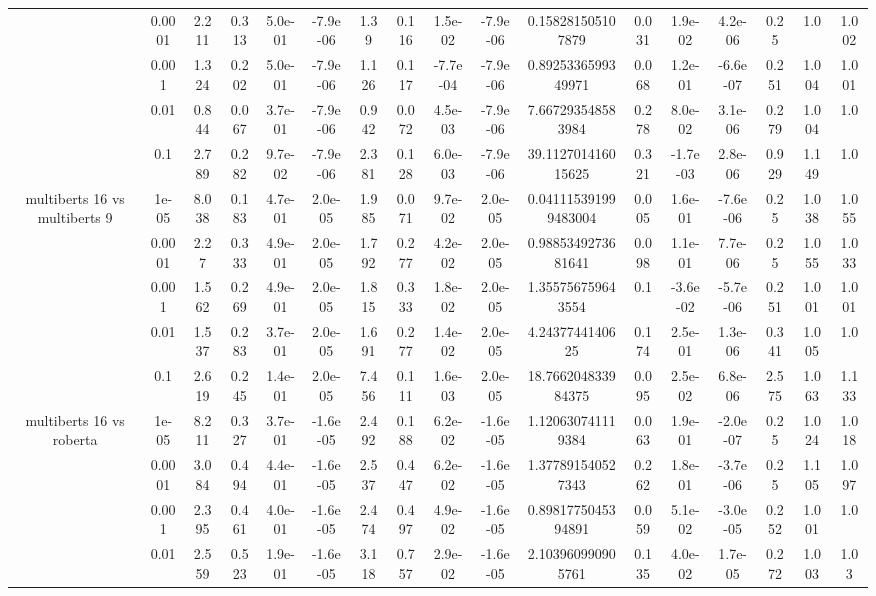 \begin{tabular}{|c|c|c|c|c|c|c|c|c|c|c|c|c|c|c|c|c|}
 & 0.0001 & 2.211 & 0.313 & 5.0e-01 & -7.9e-06 & 1.39 & 0.116 & 1.5e-02 & -7.9e-06 & 0.158281505107879 & 0.031 & 1.9e-02 & 4.2e-06 & 0.25 & 1.0 & 1.002 \\
 & 0.001 & 1.324 & 0.202 & 5.0e-01 & -7.9e-06 & 1.126 & 0.117 & -7.7e-04 & -7.9e-06 & 0.8925336599349971 & 0.068 & 1.2e-01 & -6.6e-07 & 0.251 & 1.004 & 1.001 \\
 & 0.01 & 0.844 & 0.067 & 3.7e-01 & -7.9e-06 & 0.942 & 0.072 & 4.5e-03 & -7.9e-06 & 7.667293548583984 & 0.278 & 8.0e-02 & 3.1e-06 & 0.279 & 1.004 & 1.0 \\
 & 0.1 & 2.789 & 0.282 & 9.7e-02 & -7.9e-06 & 2.381 & 0.128 & 6.0e-03 & -7.9e-06 & 39.112701416015625 & 0.321 & -1.7e-03 & 2.8e-06 & 0.929 & 1.149 & 1.0 \\
\hline
\multirow{5}{*}{multiberts 16 vs multiberts 9} & 1e-05 & 8.038 & 0.183 & 4.7e-01 & 2.0e-05 & 1.985 & 0.071 & 9.7e-02 & 2.0e-05 & 0.041115391999483004 & 0.005 & 1.6e-01 & -7.6e-06 & 0.25 & 1.038 & 1.055 \\
 & 0.0001 & 2.27 & 0.333 & 4.9e-01 & 2.0e-05 & 1.792 & 0.277 & 4.2e-02 & 2.0e-05 & 0.9885349273681641 & 0.098 & 1.1e-01 & 7.7e-06 & 0.25 & 1.055 & 1.033 \\
 & 0.001 & 1.562 & 0.269 & 4.9e-01 & 2.0e-05 & 1.815 & 0.333 & 1.8e-02 & 2.0e-05 & 1.355756759643554 & 0.1 & -3.6e-02 & -5.7e-06 & 0.251 & 1.001 & 1.001 \\
 & 0.01 & 1.537 & 0.283 & 3.7e-01 & 2.0e-05 & 1.691 & 0.277 & 1.4e-02 & 2.0e-05 & 4.2437744140625 & 0.174 & 2.5e-01 & 1.3e-06 & 0.341 & 1.005 & 1.0 \\
 & 0.1 & 2.619 & 0.245 & 1.4e-01 & 2.0e-05 & 7.456 & 0.111 & 1.6e-03 & 2.0e-05 & 18.766204833984375 & 0.095 & 2.5e-02 & 6.8e-06 & 2.575 & 1.063 & 1.133 \\
\hline
\multirow{5}{*}{multiberts 16 vs roberta } & 1e-05 & 8.211 & 0.327 & 3.7e-01 & -1.6e-05 & 2.492 & 0.188 & 6.2e-02 & -1.6e-05 & 1.120630741119384 & 0.063 & 1.9e-01 & -2.0e-07 & 0.25 & 1.024 & 1.018 \\
 & 0.0001 & 3.084 & 0.494 & 4.4e-01 & -1.6e-05 & 2.537 & 0.447 & 6.2e-02 & -1.6e-05 & 1.377891540527343 & 0.262 & 1.8e-01 & -3.7e-06 & 0.25 & 1.105 & 1.097 \\
 & 0.001 & 2.395 & 0.461 & 4.0e-01 & -1.6e-05 & 2.474 & 0.497 & 4.9e-02 & -1.6e-05 & 0.8981775045394891 & 0.059 & 5.1e-02 & -3.0e-05 & 0.252 & 1.001 & 1.0 \\
 & 0.01 & 2.559 & 0.523 & 1.9e-01 & -1.6e-05 & 3.118 & 0.757 & 2.9e-02 & -1.6e-05 & 2.103960990905761 & 0.135 & 4.0e-02 & 1.7e-05 & 0.272 & 1.003 & 1.03 \\

\end{tabular}
